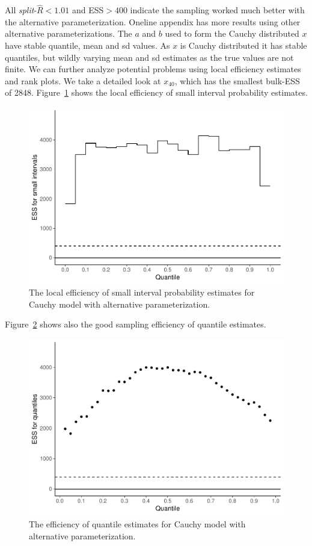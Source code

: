 \documentclass[american,]{article}
\begin{document}

All \emph{split}-\(\widehat{R}<1.01\) and ESS\(>400\) indicate the
sampling worked much better with the alternative parameterization.
Oneline appendix has more results using other
alternative parameterizations. The \(a\) and \(b\) used
to form the Cauchy distributed \(x\) have stable quantile, mean and
sd values. As \(x\) is Cauchy distributed it has stable
quantiles, but wildly varying mean and sd estimates as the true values
are not finite.
%
We can further analyze potential problems using local efficiency
estimates and rank plots. We take a detailed look at \(x_{40}\), which
has the smallest bulk-ESS of 2848.
%
Figure~\ref{fig:local-ess-fit-alt1-1} shows
the local efficiency of small interval probability estimates.
\begin{figure}[tp]
  \centering
  \includegraphics[width=0.6\linewidth]{graphics/local-ess-fit-alt1-1.pdf}
  \caption{The local efficiency of small interval probability estimates for Cauchy model with alternative parameterization.}
\label{fig:local-ess-fit-alt1-1}
\end{figure}
Figure~\ref{fig:quantile-ess-alt1-1} shows also the good sampling efficiency
of quantile estimates.
\begin{figure}[tp]
  \centering
  \includegraphics[width=0.6\linewidth]{graphics/quantile-ess-fit-alt1-1.pdf}
  \caption{The efficiency of quantile estimates for Cauchy model with alternative parameterization.}
  \label{fig:quantile-ess-alt1-1}
\end{figure}
\end{document}
